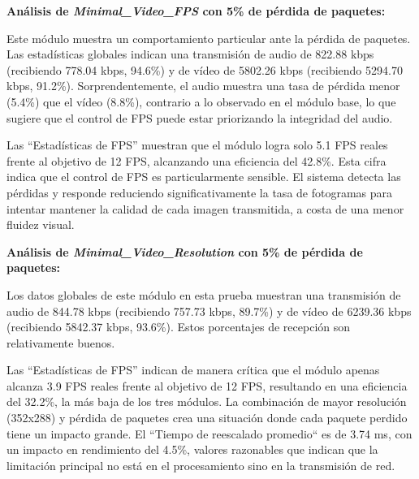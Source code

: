 \vspace{\baselineskip}

\textbf{Análisis de \textit{Minimal\_Video\_FPS} con 5\% de pérdida de paquetes:}
\vspace{\baselineskip}

Este módulo muestra un comportamiento particular ante la pérdida de paquetes. Las estadísticas globales indican una transmisión de audio de 822.88 kbps (recibiendo 778.04 kbps, 94.6\%) y de vídeo de 5802.26 kbps (recibiendo 5294.70 kbps, 91.2\%). Sorprendentemente, el audio muestra una tasa de pérdida menor (5.4\%) que el vídeo (8.8\%), contrario a lo observado en el módulo base, lo que sugiere que el control de FPS puede estar priorizando la integridad del audio.
\vspace{\baselineskip}

Las ``Estadísticas de FPS'' muestran que el módulo logra solo 5.1 FPS reales frente al objetivo de 12 FPS, alcanzando una eficiencia del 42.8\%. Esta cifra indica que el control de FPS es particularmente sensible. El sistema detecta las pérdidas y responde reduciendo significativamente la tasa de fotogramas para intentar mantener la calidad de cada imagen transmitida, a costa de una menor fluidez visual.

\vspace{\baselineskip}

\textbf{Análisis de \textit{Minimal\_Video\_Resolution} con 5\% de pérdida de paquetes:}
\vspace{\baselineskip}

Los datos globales de este módulo en esta prueba muestran una transmisión de audio de 844.78 kbps (recibiendo 757.73 kbps, 89.7\%) y de vídeo de 6239.36 kbps (recibiendo 5842.37 kbps, 93.6\%). Estos porcentajes de recepción son relativamente buenos.
\vspace{\baselineskip}

Las ``Estadísticas de FPS'' indican de manera crítica que el módulo apenas alcanza 3.9 FPS reales frente al objetivo de 12 FPS, resultando en una eficiencia del 32.2\%, la más baja de los tres módulos. La combinación de mayor resolución (352x288) y pérdida de paquetes crea una situación donde cada paquete perdido tiene un impacto grande. El ``Tiempo de reescalado promedio`` es de 3.74 ms, con un impacto en rendimiento del 4.5\%, valores razonables que indican que la limitación principal no está en el procesamiento sino en la transmisión de red.
\vspace{\baselineskip}

